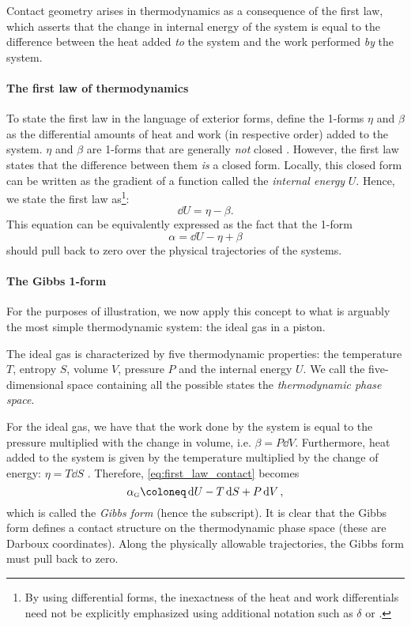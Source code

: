 Contact geometry arises in thermodynamics as a consequence of the first law, which asserts that the change in internal energy of the system is equal to the difference between the heat added \emph{to} the system and the work performed \emph{by} the system. 

\paragraph{The first law of thermodynamics} To state the first law in the language of exterior forms, define the 1-forms $\eta$ and $\beta$ as the differential amounts of heat and work (in respective order) added to the system. $\eta$ and $\beta$ are 1-forms that are generally \emph{not} closed \cite{Bamberg1988,Frankel2012}. However, the first law states that the difference between them \emph{is} a closed form. Locally, this closed form  can be written as the gradient of a function called the \emph{internal energy} $U$. Hence, we state the first law as\footnote{By using differential forms, the inexactness of the heat and work differentials need not be explicitly emphasized using additional notation such as $\delta$ or \dj.}:
\begin{equation}
    \dd{U} = \eta - \beta.
    \label{eq:thermo_first_law}
\end{equation}
This equation can be equivalently expressed as the fact that the 1-form
\begin{equation}
    \alpha = \dd{U} - \eta + \beta
    \label{eq:first_law_contact}
\end{equation}
should pull back to zero over the physical trajectories of the systems.

\paragraph{The Gibbs 1-form} For the purposes of illustration, we now apply this concept to what is arguably the most simple thermodynamic system: the ideal gas in a piston. 

The ideal gas is characterized by five thermodynamic properties: the temperature $T$, entropy $S$, volume $V$, pressure $P$ and the internal energy $U$. We call the five-dimensional space containing all the possible states the \emph{thermodynamic phase space}.

For the ideal gas, we have that the work done by the system is equal to the pressure multiplied with the change in volume, i.e. $\beta = P\dd{V}$. Furthermore, heat added to the system is given by the temperature multiplied by the change of energy: $\eta = T\dd{S}$ \cite{Arnold1989b,Wightman1979,Bamberg1988}. Therefore, \cref{eq:first_law_contact} becomes
\begin{equation}
    \alpha_\text{\tiny G} \coloneq \dd{U} - T\dd{S} + P\dd{V},
    \label{eq:gibbs_form}
\end{equation}
which is called the \emph{Gibbs form} (hence the subscript). It is clear that the Gibbs form defines a contact structure on the thermodynamic phase space (these are Darboux coordinates). Along the physically allowable trajectories, the Gibbs form must pull back to zero.

